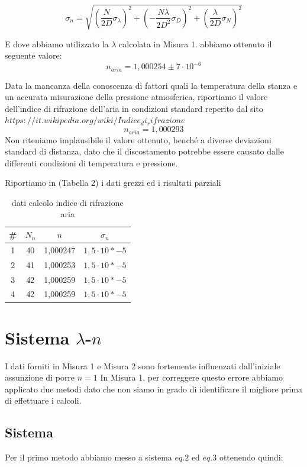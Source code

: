 \documentclass{article}
\begin{document}
\begin{equation}
\sigma_n = \sqrt{ (\frac{N}{2D} \sigma_\lambda)^2 + ({-} \frac{N \lambda}{2 D^2} \sigma_D)^2 + (\frac{\lambda}{2D} \sigma_N)^2} 
\end{equation}

E dove abbiamo utilizzato la $\lambda$ calcolata in Misura 1. abbiamo ottenuto il seguente valore:
\[ n_{aria} = 1,000254 \pm 7 \cdot 10^{-6} \]

Data la mancanza della conoscenza di fattori quali la temperatura della stanza e un accurata misurazione della pressione atmosferica, riportiamo il valore dell'indice di rifrazione dell'aria in condizioni standard reperito dal sito ${https://it.wikipedia.org/wiki/Indice_di_rifrazione}$
\[ n_{aria} = 1,000293  \]
Non riteniamo implausibile il valore ottenuto, benché a diverse deviazioni standard di distanza,  dato che il discostamento potrebbe essere causato dalle differenti condizioni di temperatura e pressione.

Riportiamo in (Tabella 2) i dati grezzi ed i risultati parziali


\begin{table}[h!]
\centering
\begin{tabular}{ | c | c | c | c | }
\hline
 \# & $N_n$ & $n$ & $\sigma_n$\\
\hline
   1 & 40 & 1,000247 & $1,5 \cdot 10*{-5}$\\
   2 & 41 & 1,000253 & $1,5 \cdot 10*{-5}$\\
   3 & 42 & 1,000259 & $1,5 \cdot 10*{-5}$\\
   4 & 42 & 1,000259 & $1,5 \cdot 10*{-5}$\\
\hline
\end{tabular}
\caption{dati calcolo indice di rifrazione aria}
\label{table:2}
\end{table}




\section{Sistema $\lambda$-$n$}
I dati forniti in Misura 1 e Misura 2 sono fortemente influenzati dall'iniziale assunzione di porre $n = 1$ In Misura 1, per correggere questo errore abbiamo applicato due metodi dato che non siamo in grado di identificare il migliore prima di effettuare i calcoli. 



\subsection{Sistema}
Per il primo metodo abbiamo messo a sistema $eq.2$ ed $eq.3$ ottenendo quindi:
\end{document}
